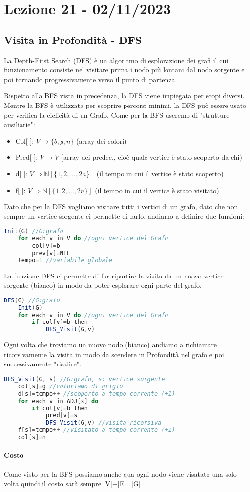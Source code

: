 \section{Lezione 21 - 02/11/2023}

\subsection{Visita in Profondità - DFS}
La Depth-First Search (DFS) è un algoritmo di esplorazione dei grafi il cui funzionamento consiste nel visitare prima i nodo più lontani dal nodo sorgente e poi tornando progressivamente verso il punto di partenza. 
\smallskip

Rispetto alla BFS vista in precedenza, la DFS viene impiegata per scopi diversi. Mentre la BFS è utilizzata per scoprire percorsi minimi, la DFS può essere usato per verifica la ciclicità di un Grafo.
\smallskip
Come per la BFS useremo di "strutture ausiliarie":
\begin{itemize}
    \item Col[ ]: $V \rightarrow \{b,g,n\}$ (array dei colori)
    \item Pred[ ]: $V \rightarrow V$ (array dei predec., cioè quale vertice è stato scoperto da chi)
    \item d[ ]: $V \Rightarrow \mathbb{N}[\{1,2,...,2n\}]$ (il tempo in cui il vertice è stato scoperto)
    \item f[ ]: $V \Rightarrow \mathbb{N}[\{1,2,...,2n\}]$ (il tempo in cui il vertice è stato visitato)
\end{itemize}
\smallskip

Dato che per la DFS vogliamo visitare tutti i vertici di un grafo, dato che non sempre un vertice sorgente ci permette di farlo, andiamo a definire due funzioni:

\begin{lstlisting}[language=Java]
Init(G) //G:grafo
    for each v in V do //ogni vertice del Grafo
        col[v]=b  
        prev[v]=NIL
    tempo=1 //variabile globale
\end{lstlisting}
La funzione DFS ci permette di far ripartire la visita da un nuovo vertice sorgente (bianco) in modo da poter esplorare ogni parte del grafo. 
\begin{lstlisting}[language=Java]
DFS(G) //G:grafo
    Init(G)
    for each v in V do //ogni vertice del Grafo
        if col[v]=b then 
            DFS_Visit(G,v)
\end{lstlisting}
Ogni volta che troviamo un nuovo nodo (bianco) andiamo a richiamare ricorsivamente la visita in modo da scendere in Profondità nel grafo e poi successivamente "risalire".
\begin{lstlisting}[language=Java]
DFS_Visit(G, s) //G:grafo, s: vertice sorgente
    col[s]=g //coloriamo di grigio 
    d[s]=tempo++ //scoperto a tempo corrente (+1)
    for each v in ADJ[s] do
        if col[v]=b then
            pred[v]=s
            DFS_Visit(G,v) //visita ricorsiva
    f[s]=tempo++ //visitato a tempo corrente (+1)
    col[s]=n
\end{lstlisting}

\paragraph{Costo} Come visto per la BFS possiamo anche qua ogni nodo viene visatato una solo volta quindi il costo sarà sempre |V|+|E|=|G|
